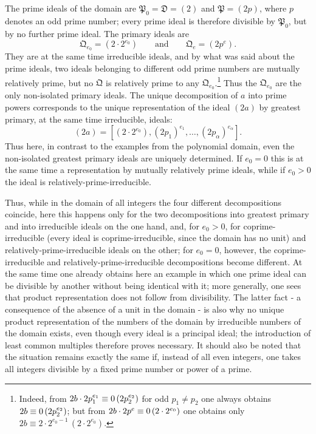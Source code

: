 \documentclass[11pt]{article}
\providecommand{\ideal}[1]{\mathfrak{#1}}
\begin{document}
The prime ideals of the domain are $\ideal P_0=\ideal D=(2)$ and $\ideal P=(2p)$, where $p$ denotes an odd prime number; every prime ideal is therefore divisible by $\ideal P_0$, but by no further prime ideal. The primary ideals are
\[
 \ideal Q_{e_0}=(2\cdot2^{e_0})
 \qquad\text{and}\qquad
 \ideal Q_e=(2p^e).
\]
They are at the same time irreducible ideals, and by what was said about the prime ideals, two ideals belonging to different odd prime numbers are mutually relatively prime, but no $\ideal Q$ is relatively prime to any $\ideal Q_{e_0}$.\footnote{Indeed, from $2b\cdot2p_1^{e_1}\equiv 0\,(2p_2^{e_2})$ for odd $p_1\ne p_2$ one always obtains $2b\equiv 0\,(2p_2^{e_2})$; but from $2b\cdot2p^e\equiv 0\,(2\cdot2^{e_0})$ one obtains only $2b\equiv2\cdot2^{e_0-1}\,(2\cdot2^{e_0})$.} Thus the $\ideal Q_{e_0}$ are the only non-isolated primary ideals. The unique decomposition of $a$ into prime powers corresponds to the unique representation of the ideal $(2a)$ by greatest primary, at the same time irreducible, ideals:
\[
 (2a)=[(2\cdot2^{e_0}),(2p_1)^{e_1},\ldots,(2p_\alpha)^{e_\alpha}].
\]
Thus here, in contrast to the examples from the polynomial domain, even the non-isolated greatest primary ideals are uniquely determined. If $e_0=0$ this is at the same time a representation by mutually relatively prime ideals, while if $e_0>0$ the ideal is relatively-prime-irreducible.

Thus, while in the domain of all integers the four different decompositions coincide, here this happens only for the two decompositions into greatest primary and into irreducible ideals on the one hand, and, for $e_0>0$, for coprime-irreducible (every ideal is coprime-irreducible, since the domain has no unit) and relatively-prime-irreducible ideals on the other; for $e_0=0$, however, the coprime-irreducible and relatively-prime-irreducible decompositions become different. At the same time one already obtains here an example in which one prime ideal can be divisible by another without being identical with it; more generally, one sees that product representation does not follow from divisibility. The latter fact - a consequence of the absence of a unit in the domain - is also why no unique product representation of the numbers of the domain by irreducible numbers of the domain exists, even though every ideal is a principal ideal; the introduction of least common multiples therefore proves necessary. It should also be noted that the situation remains exactly the same if, instead of all even integers, one takes all integers divisible by a fixed prime number or power of a prime.
\end{document}
